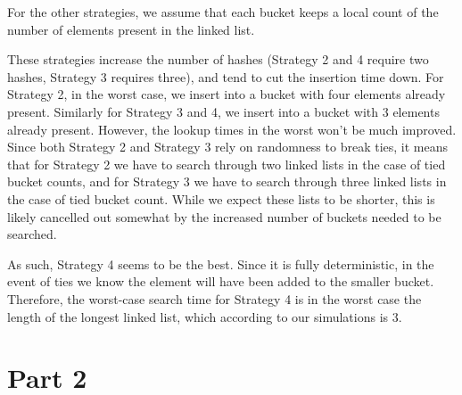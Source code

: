 \documentclass[12pt]{article}
\begin{document}
\begin{enumerate}[label=(\alph*)]
    For the other strategies, we assume that each bucket keeps a local count of the number of elements present in the linked list.

    These strategies increase the number of hashes (Strategy 2 and 4 require two hashes, Strategy 3 requires three), and tend to cut the insertion time down. For Strategy 2, in the worst case, we insert into a bucket with four elements already present. Similarly for Strategy 3 and 4, we insert into a bucket with 3 elements already present. However, the lookup times in the worst won't be much improved. Since both Strategy 2 and Strategy 3 rely on randomness to break ties, it means that for Strategy 2 we have to search through two linked lists in the case of tied bucket counts, and for Strategy 3 we have to search through three linked lists in the case of tied bucket count. While we expect these lists to be shorter, this is likely cancelled out somewhat by the increased number of buckets needed to be searched.

    As such, Strategy 4 seems to be the best. Since it is fully deterministic, in the event of ties we know the element will have been added to the smaller bucket. Therefore, the worst-case search time for Strategy 4 is in the worst case the length of the longest linked list, which according to our simulations is 3.
\end{enumerate}

\newpage
\section*{Part 2}
\end{document}
